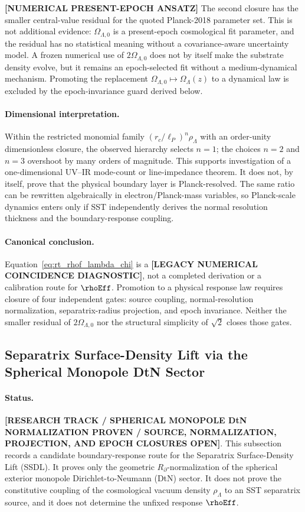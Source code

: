 \textbf{[NUMERICAL PRESENT-EPOCH ANSATZ]} The second closure has the smaller
central-value residual for the quoted Planck-2018 parameter set.  This is not
additional evidence: \(\Omega_{\Lambda,0}\) is a present-epoch cosmological
fit parameter, and the residual has no statistical meaning without a
covariance-aware uncertainty model.  A frozen numerical use of
\(2\Omega_{\Lambda,0}\) does not by itself make the substrate density evolve,
but it remains an epoch-selected fit without a medium-dynamical mechanism.
Promoting the replacement
\(\Omega_{\Lambda,0}\mapsto\Omega_\Lambda(z)\) to a dynamical law is excluded
by the epoch-invariance guard derived below.

\paragraph{Dimensional interpretation.}
Within the restricted monomial family
\((r_c/\ell_P)^n\rho_\Lambda\) with an order-unity dimensionless closure,
the observed hierarchy selects \(n=1\); the choices \(n=2\) and \(n=3\)
overshoot by many orders of magnitude.  This supports investigation of a
one-dimensional UV--IR mode-count or line-impedance theorem.  It does not,
by itself, prove that the physical boundary layer is Planck-resolved.  The
same ratio can be rewritten algebraically in electron/Planck-mass variables,
so Planck-scale dynamics enters only if SST independently derives the normal
resolution thickness and the boundary-response coupling.

\paragraph{Canonical conclusion.}
Equation~\eqref{eq:rt_rhof_lambda_chi} is a
\textbf{[LEGACY NUMERICAL COINCIDENCE DIAGNOSTIC]}, not a completed
derivation or a calibration route for \(\rhoEff\).  Promotion to a physical
response law requires closure of four independent gates:
source coupling, normal-resolution normalization, separatrix-radius
projection, and epoch invariance.  Neither the smaller residual of
\(2\Omega_{\Lambda,0}\) nor the structural simplicity of \(\sqrt{2}\) closes
those gates.

\subsection{Separatrix Surface-Density Lift via the Spherical Monopole DtN Sector}
\label{subsec:ssdl_monopole_dtn}

\paragraph{Status.}
\textbf{[RESEARCH TRACK / SPHERICAL MONOPOLE DtN NORMALIZATION PROVEN / SOURCE, NORMALIZATION, PROJECTION, AND EPOCH CLOSURES OPEN]}.
This subsection records a candidate boundary-response route for the
Separatrix Surface-Density Lift (SSDL).  It proves only the geometric
\(R_\partial\)-normalization of the spherical exterior monopole
Dirichlet-to-Neumann (DtN) sector.  It does not prove the constitutive
coupling of the cosmological vacuum density \(\rho_\Lambda\) to an SST
separatrix source, and it does not determine the unfixed response
\(\rhoEff\).

